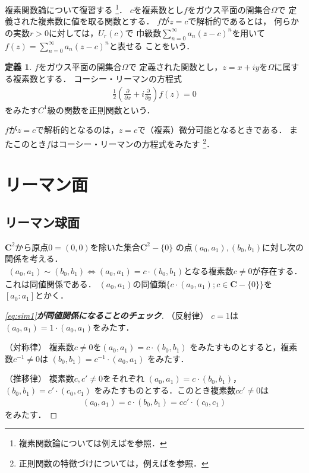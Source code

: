 \documentclass[11pt, a4paper, dvipdfmx, draft]{jsarticle}
\theoremstyle{definition}
\newtheorem{Definition}[Axiom]{定義}
\newcommand{\cc}{\mathbf{C}}
\newcommand{\p}{\partial}
\newcommand{\dip}{\displaystyle} %
\theoremstyle{mystyle}
\numberwithin{equation}{section} %
\begin{document}
複素関数論について復習する
\footnote{複素関数論については例えば\cite{jimbo,yoshida,kaneko,fuji}を参照．}．
$c$を複素数とし$f$をガウス平面の開集合$\varOmega$で
定義された複素数に値を取る関数とする．
$f$が$z=c$で解析的であるとは，
何らかの実数$r>0$に対しては，$U_r(c)$で
巾級数$\dip \sum_{n=0}^{\infty}a_{n}(z-c)^{n}$を用いて
$\dip f(z)=\sum_{n=0}^{\infty}a_{n}(z-c)^{n}$と表せる
ことをいう．
\begin{Definition}
    $f$をガウス平面の開集合$\varOmega$で
    定義された関数とし，$z=x+iy$を$\varOmega$に属する複素数とする．
    コーシー・リーマンの方程式
    \begin{align}
        \frac{1}{2}\left(\frac{\p}{\p x}+i\frac{\p}{\p y}\right)f(z)=0
    \end{align}
    をみたす$C^1$級の関数を正則関数という．
\end{Definition}
$f$が$z=c$で解析的となるのは，$z=c$で（複素）微分可能となるときである．
またこのとき$f$はコーシー・リーマンの方程式をみたす
\footnote{正則関数の特徴づけについては，例えば\cite[4.3節]{kaneko}を参照．}．


\section{リーマン面}

\subsection{リーマン球面}

$\cc^{2}$から原点$0=(0,0)$を除いた集合$\cc^{2}-\{0\}$
の点$(a_{0},a_{1}), (b_{0},b_{1})$に対し次の関係を考える．
\begin{align}\label{eq:sim1}
    (a_{0},a_{1})\sim (b_{0},b_{1})
    \Longleftrightarrow
    (a_{0},a_{1})= c\cdot(b_{0},b_{1})
    \text{となる複素数}c\neq0\text{が存在する．}
\end{align}
これは同値関係である．
$(a_0,a_1)$の同値類$\{c\cdot(a_0,a_1); c\in\cc-\{0\}\}$を
$[a_0\colon a_1]$とかく．
\begin{proof}[\eqref{eq:sim1}\textbf{が同値関係になることのチェック}]
    
    （反射律）
    $c=1$は$(a_{0},a_{1})= 1\cdot(a_{0},a_{1})$をみたす．

    （対称律）
    複素数$c\neq0$を$(a_{0},a_{1})= c \cdot (b_{0},b_{1})$
    をみたすものとすると，複素数$c^{-1}\neq0$は
    $(b_{0},b_{1})=c^{-1} \cdot(a_{0},a_{1})$
    をみたす．

    （推移律）
    複素数$c,c'\neq0$をそれぞれ
    $(a_{0},a_{1})= c \cdot (b_{0},b_{1})$，
    $(b_{0},b_{1})= c' \cdot (c_{0},c_{1})$
    をみたすものとする．このとき複素数$cc'\neq0$は
    \begin{align*}
        (a_{0},a_{1})
        = c \cdot (b_{0},b_{1})
        =cc' \cdot (c_{0},c_{1})
    \end{align*}
    をみたす．
\end{proof}
\end{document}
